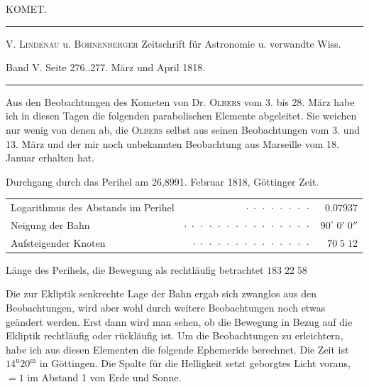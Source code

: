 \clearpage{}\hypertarget{native-407-part-lower}{}\label{native-407-part-lower}
\begin{center}\large KOMET.\end{center}
\begin{center}\hrule\vspace{4pt}\fontsize{10}{12}\selectfont V. \textsc{Lindenau} u. \textsc{Bohnenberger} Zeitschrift für Astronomie u. verwandte Wiss.\par Band V. Seite 276..277. März und April 1818.\par\vspace{4pt}\hrule\vspace{4pt}\end{center}
\par\indent Aus den Beobachtungen des Kometen von Dr. \textsc{Olbers} vom 3. bis 28. März habe ich in diesen Tagen die folgenden parabolischen Elemente abgeleitet. Sie weichen nur wenig von denen ab, die \textsc{Olbers} selbst aus seinen Beobachtungen vom 3. und 13. März und der mir noch unbekannten Beobachtung aus Marseille vom 18. Januar erhalten hat.

\begin{center}\fontsize{10}{12}\selectfont
Durchgang durch das Perihel am 26,8991. Februar 1818, Göttinger Zeit.
\par\smallskip\begin{tabular}{lrr}
Logarithmus des Abstands im Perihel & $\cdot\;\cdot\;\cdot\;\cdot\;\cdot\;\cdot\;\cdot\;\cdot$ & $0.07937$\\
Neigung der Bahn & $\cdot\;\cdot\;\cdot\;\cdot\;\cdot\;\cdot\;\cdot\;\cdot\;\cdot\;\cdot\;\cdot\;\cdot\;\cdot\;\cdot\;\cdot$ & $90^\circ\;0'\;0''$\\
Aufsteigender Knoten & $\cdot\;\cdot\;\cdot\;\cdot\;\cdot\;\cdot\;\cdot\;\cdot\;\cdot\;\cdot\;\cdot\;\cdot\;\cdot\;\cdot$ & $70\;5\;12$\\
\end{tabular}
\par\smallskip Länge des Perihels, die Bewegung als rechtläufig betrachtet $183\;22\;58$
\end{center}
\par\indent Die zur Ekliptik senkrechte Lage der Bahn ergab sich zwanglos aus den Beobachtungen, wird aber wohl durch weitere Beobachtungen noch etwas geändert werden. Erst dann wird man sehen, ob die Bewegung in Bezug auf die Ekliptik rechtläufig oder rückläufig ist. Um die Beobachtungen zu erleichtern, habe ich aus diesen Elementen die folgende Ephemeride berechnet. Die Zeit ist $14^{\mathrm u}20^{\mathrm m}$ in Göttingen. Die Spalte für die Helligkeit setzt geborgtes Licht voraus, $=1$ im Abstand 1 von Erde und Sonne.

